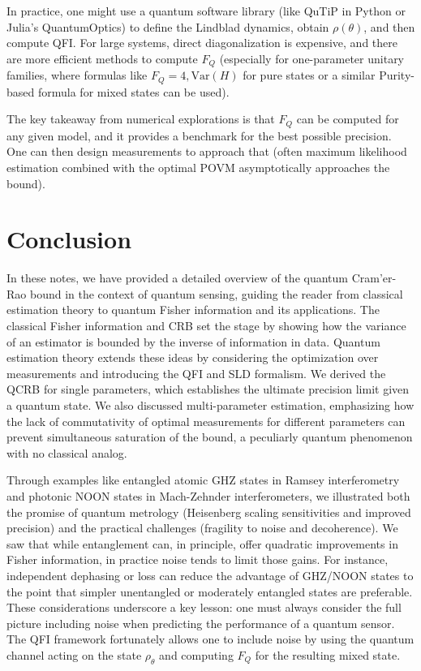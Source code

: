In practice, one might use a quantum software library (like QuTiP in
Python or Julia’s QuantumOptics) to define the Lindblad dynamics,
obtain $\rho(\theta)$, and then compute QFI. For large systems, direct
diagonalization is expensive, and there are more efficient methods to
compute $F_Q$ (especially for one-parameter unitary families, where
formulas like $F_Q = 4 , \text{Var}(H)$ for pure states or a similar
Purity-based formula for mixed states can be used).



The key takeaway from numerical explorations is that $F_Q$ can be
computed for any given model, and it provides a benchmark for the best
possible precision. One can then design measurements to approach that
(often maximum likelihood estimation combined with the optimal POVM
asymptotically approaches the bound).



\section{Conclusion}



In these notes, we have provided a detailed overview of the quantum
Cram'er-Rao bound in the context of quantum sensing, guiding the
reader from classical estimation theory to quantum Fisher information
and its applications. The classical Fisher information and CRB set the
stage by showing how the variance of an estimator is bounded by the
inverse of information in data. Quantum estimation theory extends
these ideas by considering the optimization over measurements and
introducing the QFI and SLD formalism. We derived the QCRB for single
parameters, which establishes the ultimate precision limit given a
quantum state. We also discussed multi-parameter estimation,
emphasizing how the lack of commutativity of optimal measurements for
different parameters can prevent simultaneous saturation of the bound,
a peculiarly quantum phenomenon with no classical analog.



Through examples like entangled atomic GHZ states in Ramsey
interferometry and photonic NOON states in Mach-Zehnder
interferometers, we illustrated both the promise of quantum metrology
(Heisenberg scaling sensitivities and improved precision) and the
practical challenges (fragility to noise and decoherence). We saw that
while entanglement can, in principle, offer quadratic improvements in
Fisher information, in practice noise tends to limit those gains. For
instance, independent dephasing or loss can reduce the advantage of
GHZ/NOON states to the point that simpler unentangled or moderately
entangled states are preferable. These considerations underscore a key
lesson: one must always consider the full picture including noise when
predicting the performance of a quantum sensor. The QFI framework
fortunately allows one to include noise by using the quantum channel
acting on the state $\rho_\theta$ and computing $F_Q$ for the
resulting mixed state.



